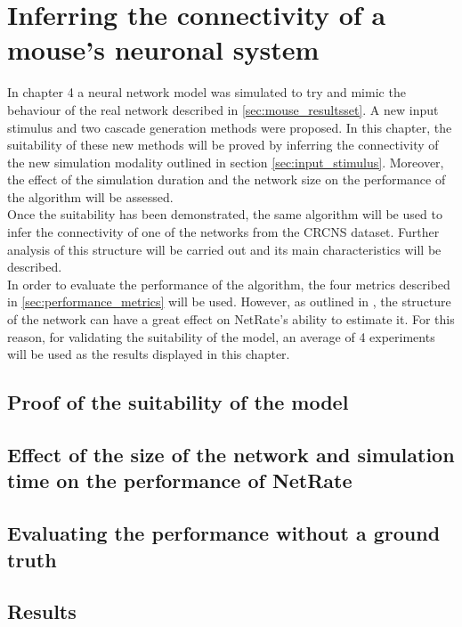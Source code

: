 
\chapter{Inferring the connectivity of a mouse's neuronal system}

In chapter 4 a neural network model was simulated to try and mimic the behaviour of the real network described in \ref{sec:mouse_resultsset}. A new input stimulus and two cascade generation methods were proposed. In this chapter, the suitability of these new methods will be proved by inferring the connectivity of the new simulation modality outlined in section \ref{sec:input_stimulus}. Moreover, the effect of the simulation duration and the network size on the performance of the algorithm will be assessed.\\

Once the suitability has been demonstrated, the same algorithm will be used to infer the connectivity of one of the networks from the CRCNS dataset. Further analysis of this structure will be carried out and its main characteristics will be described.\\

In order to evaluate the performance of the algorithm, the four metrics described in \ref{sec:performance_metrics} will be used. However, as outlined in \cite{pranav_report}, the structure of the network can have a great effect on NetRate's ability to estimate it. For this reason, for validating the suitability of the model, an average of 4 experiments will be used as the results displayed in this chapter.


\section{Proof of the suitability of the model}




\section{Effect of the size of the network and simulation time on the performance of NetRate}
\section{Evaluating the performance without a ground truth}
\section{Results}
